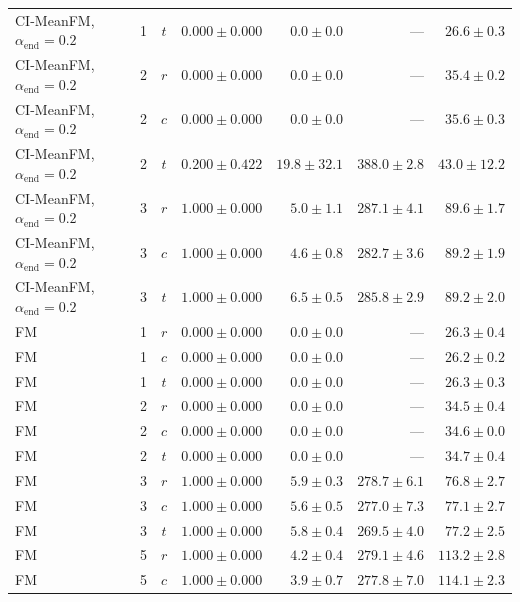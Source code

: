 \begin{table}[htpb]
\begin{tabularx}{\linewidth}{@{}L r c rrrr@{}}
    CI-MeanFM, $\alpha_{\mathrm{end}}=0.2$ & 1 & $t$ & $0.000 \pm 0.000$ & $0.0 \pm 0.0$ & --- & $26.6 \pm 0.3$ \\
    \addlinespace[2pt]
    CI-MeanFM, $\alpha_{\mathrm{end}}=0.2$ & 2 & $r$ & $0.000 \pm 0.000$ & $0.0 \pm 0.0$ & --- & $35.4 \pm 0.2$ \\
    CI-MeanFM, $\alpha_{\mathrm{end}}=0.2$ & 2 & $c$ & $0.000 \pm 0.000$ & $0.0 \pm 0.0$ & --- & $35.6 \pm 0.3$ \\
    CI-MeanFM, $\alpha_{\mathrm{end}}=0.2$ & 2 & $t$ & $0.200 \pm 0.422$ & $19.8 \pm 32.1$ & $388.0 \pm 2.8$ & $43.0 \pm 12.2$ \\
    \addlinespace[2pt]
    CI-MeanFM, $\alpha_{\mathrm{end}}=0.2$ & 3 & $r$ & $1.000 \pm 0.000$ & $5.0 \pm 1.1$ & $287.1 \pm 4.1$ & $89.6 \pm 1.7$ \\
    CI-MeanFM, $\alpha_{\mathrm{end}}=0.2$ & 3 & $c$ & $1.000 \pm 0.000$ & $4.6 \pm 0.8$ & $282.7 \pm 3.6$ & $89.2 \pm 1.9$ \\
    CI-MeanFM, $\alpha_{\mathrm{end}}=0.2$ & 3 & $t$ & $1.000 \pm 0.000$ & $6.5 \pm 0.5$ & $285.8 \pm 2.9$ & $89.2 \pm 2.0$ \\
    \addlinespace[2pt]
    FM & 1 & $r$ & $0.000 \pm 0.000$ & $0.0 \pm 0.0$ & --- & $26.3 \pm 0.4$ \\
    FM & 1 & $c$ & $0.000 \pm 0.000$ & $0.0 \pm 0.0$ & --- & $26.2 \pm 0.2$ \\
    FM & 1 & $t$ & $0.000 \pm 0.000$ & $0.0 \pm 0.0$ & --- & $26.3 \pm 0.3$ \\
    \addlinespace[2pt]
    FM & 2 & $r$ & $0.000 \pm 0.000$ & $0.0 \pm 0.0$ & --- & $34.5 \pm 0.4$ \\
    FM & 2 & $c$ & $0.000 \pm 0.000$ & $0.0 \pm 0.0$ & --- & $34.6 \pm 0.0$ \\
    FM & 2 & $t$ & $0.000 \pm 0.000$ & $0.0 \pm 0.0$ & --- & $34.7 \pm 0.4$ \\
    \addlinespace[2pt]
    FM & 3 & $r$ & $1.000 \pm 0.000$ & $5.9 \pm 0.3$ & $278.7 \pm 6.1$ & $76.8 \pm 2.7$ \\
    FM & 3 & $c$ & $1.000 \pm 0.000$ & $5.6 \pm 0.5$ & $277.0 \pm 7.3$ & $77.1 \pm 2.7$ \\
    FM & 3 & $t$ & $1.000 \pm 0.000$ & $5.8 \pm 0.4$ & $269.5 \pm 4.0$ & $77.2 \pm 2.5$ \\
    \addlinespace[2pt]
    FM & 5 & $r$ & $1.000 \pm 0.000$ & $4.2 \pm 0.4$ & $279.1 \pm 4.6$ & $113.2 \pm 2.8$ \\
    FM & 5 & $c$ & $1.000 \pm 0.000$ & $3.9 \pm 0.7$ & $277.8 \pm 7.0$ & $114.1 \pm 2.3$ \\

\end{tabularx}
\end{table}
